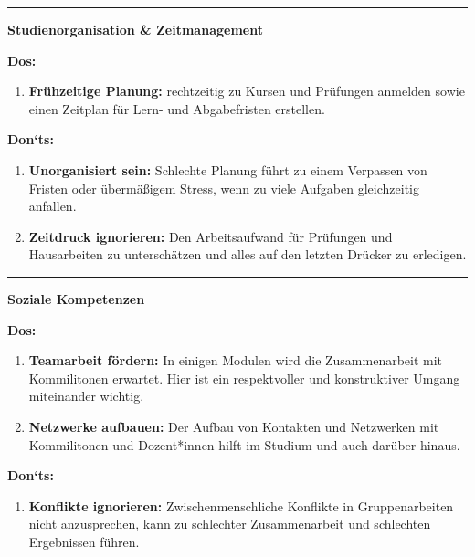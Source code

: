 \documentclass[10pt, oneside]{article}
\begin{document}
\vspace{2pt}
\hrule
\vspace{5pt}

\bgroup
\large\textbf{Studienorganisation \& Zeitmanagement}
\egroup

\begin{multicols}{2}

\textbf{Dos:}

\begin{enumerate}[-]
    \item \textbf{Frühzeitige Planung:} rechtzeitig zu Kursen und Prüfungen
        anmelden sowie einen Zeitplan für Lern- und Abgabefristen erstellen.
\end{enumerate}

\vfill
\null
\columnbreak

\textbf{Don`ts:}

\begin{enumerate}[-]
    \item \textbf{Unorganisiert sein:} Schlechte Planung führt zu einem
        Verpassen von Fristen oder übermäßigem Stress, wenn zu viele Aufgaben
        gleichzeitig anfallen.
    \item \textbf{Zeitdruck ignorieren:} Den Arbeitsaufwand für Prüfungen und
        Hausarbeiten zu unterschätzen und alles auf den letzten Drücker zu
        erledigen.
\end{enumerate}

\end{multicols}

\vspace{2pt}
\hrule
\vspace{5pt}

\bgroup
\large\textbf{Soziale Kompetenzen}
\egroup

\begin{multicols}{2}

\textbf{Dos:}

\begin{enumerate}[-]
    \item \textbf{Teamarbeit fördern:} In einigen Modulen wird die
        Zusammenarbeit mit Kommilitonen erwartet. Hier ist ein respektvoller
        und konstruktiver Umgang miteinander wichtig.
    \item \textbf{Netzwerke aufbauen:} Der Aufbau von Kontakten und Netzwerken
        mit Kommilitonen und Dozent*innen hilft im Studium und auch darüber
        hinaus.
\end{enumerate}

\columnbreak

\textbf{Don`ts:}

\begin{enumerate}[-]
    \item \textbf{Konflikte ignorieren:} Zwischenmenschliche Konflikte in
        Gruppenarbeiten nicht anzusprechen, kann zu schlechter Zusammenarbeit
        und schlechten Ergebnissen führen.
\end{enumerate}

\end{multicols}
\end{document}
